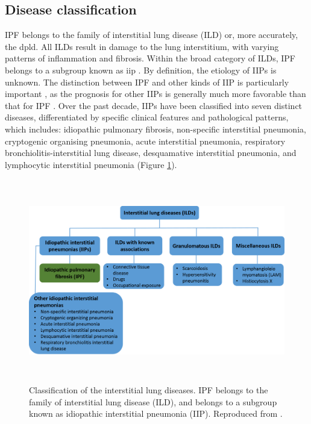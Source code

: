 \subsection{Disease classification} 
IPF belongs to the family of interstitial lung disease (ILD) or, more accurately, the \gls{dpld}. All ILDs result in damage to the lung interstitium, with varying patterns of inflammation and fibrosis. Within the broad category of ILDs, IPF belongs to a subgroup known as \gls{iip} \citep{meltzer2008idiopathic}. By definition, the etiology of IIPs is unknown. The distinction between IPF and other kinds of IIP is particularly important \citep{corte2015idiopathic, troy2012management}, as the prognosis for other IIPs is generally much more favorable than that for IPF \citep{meltzer2008idiopathic}. Over the past decade, IIPs have been classified into seven distinct diseases, differentiated by specific clinical features and pathological patterns, which includes: idiopathic pulmonary fibrosis, non-specific interstitial pneumonia, cryptogenic organising pneumonia, acute interstitial pneumonia, respiratory bronchiolitis-interstitial lung disease, desquamative interstitial pneumonia, and lymphocytic interstitial pneumonia \citep{katzenstein1998idiopathic, troy2012management} (Figure \ref{fig:DiseaseClassification}).

\begin{figure}[htbp]
  \centering 
  \includegraphics[height=3.5in]{Background/Image/DiseaseClassification.png}
  \caption{Classification of the interstitial lung diseases. IPF belongs to the family of interstitial lung disease (ILD), and belongs to a subgroup known as idiopathic interstitial pneumonia (IIP). Reproduced from \citep{troy2012management}.}
  \label{fig:DiseaseClassification}
\end{figure}

